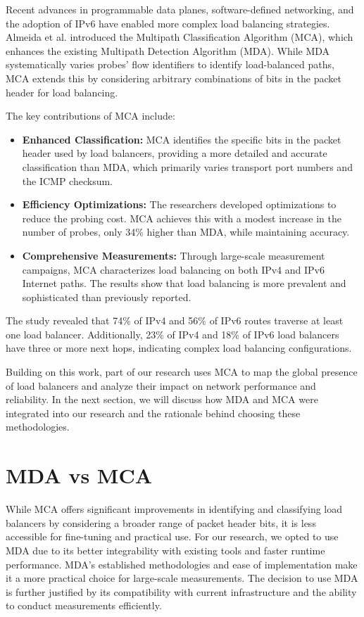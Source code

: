 \documentclass[12pt]{cwru_thesis}
\begin{document}
Recent advances in programmable data planes, software-defined networking, and the adoption of IPv6 have enabled more complex load balancing strategies. Almeida et al. introduced the Multipath Classification Algorithm (MCA), which enhances the existing Multipath Detection Algorithm (MDA). While MDA systematically varies probes' flow identifiers to identify load-balanced paths, MCA extends this by considering arbitrary combinations of bits in the packet header for load balancing.

The key contributions of MCA include:
\begin{itemize}
    \item \textbf{Enhanced Classification:} MCA identifies the specific bits in the packet header used by load balancers, providing a more detailed and accurate classification than MDA, which primarily varies transport port numbers and the ICMP checksum.
    \item \textbf{Efficiency Optimizations:} The researchers developed optimizations to reduce the probing cost. MCA achieves this with a modest increase in the number of probes, only 34\% higher than MDA, while maintaining accuracy.
    \item \textbf{Comprehensive Measurements:} Through large-scale measurement campaigns, MCA characterizes load balancing on both IPv4 and IPv6 Internet paths. The results show that load balancing is more prevalent and sophisticated than previously reported.
\end{itemize}

The study revealed that 74\% of IPv4 and 56\% of IPv6 routes traverse at least one load balancer. Additionally, 23\% of IPv4 and 18\% of IPv6 load balancers have three or more next hops, indicating complex load balancing configurations.

Building on this work, part of our research uses MCA to map the global presence of load balancers and analyze their impact on network performance and reliability. In the next section, we will discuss how MDA and MCA were integrated into our research and the rationale behind choosing these methodologies.

\section{MDA vs MCA}

While MCA offers significant improvements in identifying and classifying load balancers by considering a broader range of packet header bits, it is less accessible for fine-tuning and practical use. For our research, we opted to use MDA due to its better integrability with existing tools and faster runtime performance. MDA's established methodologies and ease of implementation make it a more practical choice for large-scale measurements. The decision to use MDA is further justified by its compatibility with current infrastructure and the ability to conduct measurements efficiently. 
\end{document}

